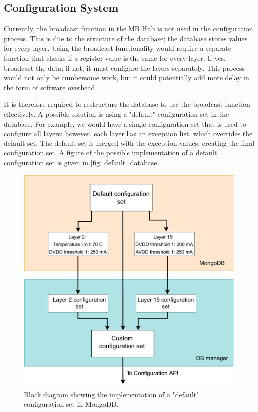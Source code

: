\documentclass[main.tex]{subfiles}
\begin{document}
\subsection{Configuration System}

Currently, the broadcast function in the MB Hub is not used in the configuration process. This is due to the structure of the database; the database stores values for every layer. Using the broadcast functionality would require a separate function that checks if a register value is the same for every layer. If yes, broadcast the data; if not, it must configure the layers separately. This process would not only be cumbersome work, but it could potentially add more delay in the form of software overhead.

It is therefore required to restructure the database to use the broadcast function effectively. A possible solution is using a "default" configuration set in the database. For example, we would have a single configuration set that is used to configure all layers; however, each layer has an exception list, which overrides the default set. The default set is merged with the exception values, creating the final configuration set. A figure of the possible implementation of a default configuration set is given in \autoref{fig: default_database}.

\begin{figure}[!ht]
    \centering
    \includegraphics[scale=0.55]{images/default_database.pdf}
    \caption{Block diagram showing the implementation of a "default" configuration set in MongoDB.}
    \label{fig: default_database}
\end{figure}
\FloatBarrier 
\end{document}
